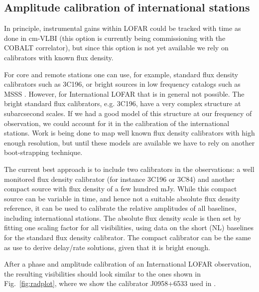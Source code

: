 \documentclass[graybox]{svmult}
\begin{document}
\subsection{Amplitude calibration of international stations}
In principle, instrumental gains within LOFAR could be tracked with time as
done in cm-VLBI (this option is currently being commissioning with the COBALT
correlator), but since this option is not yet available we rely on calibrators
with known flux density.

For core and remote stations one can use, for example, standard flux density
calibrators such as 3C196, or bright sources in low frequency catalogs such as
MSSS \citep{heald14}. However, for International LOFAR that is in general not
possible. The bright standard flux calibrators, e.g. 3C196, have a very complex
structure at subarcsecond scales. If we had a good model of this structure at
our frequency of observation, we could account for it in the calibration of the
international stations. Work is being done to map well known flux density
calibrators with high enough resolution, but until these models are available
we have to rely on another boot-strapping technique. 

The current best approach is to include two calibrators in the observations: a
well monitored flux density calibrator (for instance 3C196 or 3C84) and another
compact source with flux density of a few hundred mJy. While this compact
source can be variable in time, and hence not a suitable absolute flux density
reference, it can be used to calibrate the relative amplitudes of all
baselines, including international stations. The absolute flux density
scale is then set by fitting one scaling factor for all visibilities, using
data on the short (NL) baselines for the standard flux density calibrator.
The compact calibrator can be the same as use to derive delay/rate solutions,
given that it is bright enough.

After a phase and amplitude calibration of an International LOFAR observation,
the resulting visibilities should look similar to the ones shown in
Fig.~\ref{fig:radplot}, where we show the calibrator J0958+6533 used in
\cite{varenius15}. 
\end{document}
